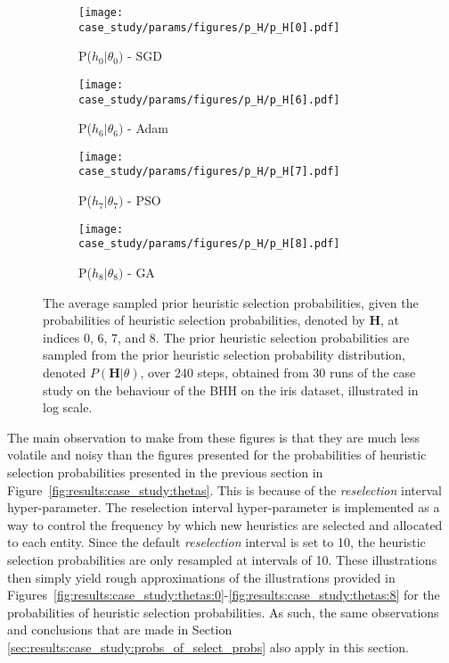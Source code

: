 \begin{figure}[htb]
	\begin{subfigure}{0.5\textwidth}
		\centering
		\texttt{[image: case\_study/params/figures/p\_H/p\_H[0].pdf]}
		\caption{P($h_{0} \vert \theta_{0})$ - \acs{SGD}}
		\label{fig:results:case_study:p_H:0}
	\end{subfigure}
	\begin{subfigure}{0.5\textwidth}
		\centering
		\texttt{[image: case\_study/params/figures/p\_H/p\_H[6].pdf]}
		\caption{P($h_{6} \vert \theta_{6})$ - \acs{Adam}}
		\label{fig:results:case_study:p_H:6}
	\end{subfigure}
	\par\bigskip
	\begin{subfigure}{0.5\textwidth}
		\centering
		\texttt{[image: case\_study/params/figures/p\_H/p\_H[7].pdf]}
		\caption{P($h_{7} \vert \theta_{7})$ - \acs{PSO}}
		\label{fig:results:case_study:p_H:7}
	\end{subfigure}
	\begin{subfigure}{0.5\textwidth}
		\centering
		\texttt{[image: case\_study/params/figures/p\_H/p\_H[8].pdf]}
		\caption{P($h_{8} \vert \theta_{8})$ - \acs{GA}}
		\label{fig:results:case_study:p_H:8}
	\end{subfigure}
	\par\bigskip
	\caption{The average sampled prior heuristic selection probabilities, given the probabilities of heuristic selection probabilities, denoted by $\boldsymbol{H}$, at indices 0, 6, 7, and 8. The prior heuristic selection probabilities are sampled from the prior heuristic selection probability distribution, denoted $P(\boldsymbol{H} \vert \theta)$, over 240 steps, obtained from 30 runs of the case study on the behaviour of the \acs{BHH} on the iris dataset, illustrated in log scale.}
	\label{fig:results:case_study:p_H}
\end{figure}

The main observation to make from these figures is that they are much less volatile and noisy than the figures presented for the probabilities of heuristic selection probabilities presented in the previous section in Figure~\ref{fig:results:case_study:thetas}. This is because of the \textit{reselection} interval hyper-parameter. The reselection interval hyper-parameter is implemented as a way to control the frequency by which new heuristics are selected and allocated to each entity. Since the default \textit{reselection} interval is set to 10, the heuristic selection probabilities are only resampled at intervals of 10. These illustrations then simply yield rough approximations of the illustrations provided in Figures~\ref{fig:results:case_study:thetas:0}-\ref{fig:results:case_study:thetas:8} for the probabilities of heuristic selection probabilities. As such, the same observations and conclusions that are made in Section \ref{sec:results:case_study:probs_of_select_probs} also apply in this section.

